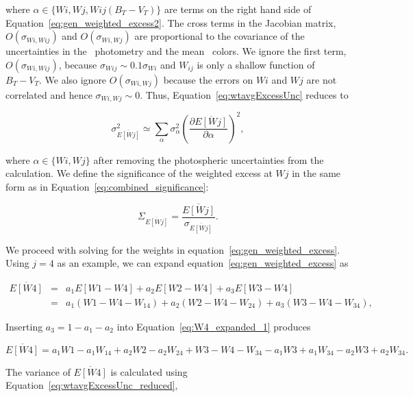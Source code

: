 \noindent where $\alpha \in \{Wi, Wj, Wij(B_T-V_T)\}$  are terms on the right hand side of Equation~\ref{eq:gen_weighted_excess2}. The cross terms in the Jacobian matrix, $O(\sigma_{Wi,Wij})$ and $O(\sigma_{Wi,Wj})$ are proportional to the covariance of the uncertainties in the \WS\ photometry and the mean \WS\ colors. We ignore the first term, $O(\sigma_{Wi,Wij})$, because $\sigma_{Wij} \sim 0.1 \sigma_{Wi}$ and $W_{ij}$ is only a shallow function of $B_T-V_T$. We also ignore $O(\sigma_{Wi,Wj})$ because the errors on $Wi$ and $Wj$ are not correlated and hence $\sigma_{Wi,Wj}\sim 0$. Thus, Equation~\ref{eq:wtavgExcessUnc} reduces to

\begin{equation}\label{eq:wtavgExcessUnc_reduced}
      \sigma_{\overline{E[Wj]}}^2 \simeq \sum_{\alpha} \sigma_{\alpha}^2 \left(\frac{\partial \overline{E[Wj]}}{\partial \alpha}\right)^2,
\end{equation}

\noindent where $\alpha \in \{Wi, Wj\}$ after removing the photospheric uncertainties from the calculation. We define the significance of the weighted excess at $Wj$ in the same form as in Equation~\ref{eq:combined_significance}:

\begin{equation}\label{eq:combined_sig_appendix}
	    \Sigma_{\overline{E[Wj]}} = \frac{\overline{E[Wj]}}{\sigma_{\overline{E[Wj]}}}. 
\end{equation}

	We proceed with solving for the weights in equation~\ref{eq:gen_weighted_excess}. Using $j=4$ as an example, we can expand equation~\ref{eq:gen_weighted_excess} as 
	
\begin{eqnarray}\label{eq:W4_expanded_1}
\overline{E[W4]} & = & a_1 E[W1-W4] + a_2 E[W2-W4] + a_3 E[W3-W4] \\
				 & = & a_1 (W1-W4-W_{14}) + a_2(W2-W4-W_{24}) + a_3(W3-W4-W_{34}),
\end{eqnarray}

\noindent Inserting $a_3 = 1-a_1-a_2$ into Equation~\ref{eq:W4_expanded_1} produces

\begin{equation}\label{eq:w4_expanded_2}
\overline{E[W4]} =  a_1W1 - a_1W_{14} + a_2 W2 - a_2 W_{24} + W3 - W4 - W_{34} - a_1W3 + a_1 W_{34} - a_2 W3 + a_2 W_{34}. 
\end{equation}

\noindent The variance of $\overline{E[W4]}$ is calculated using Equation~\ref{eq:wtavgExcessUnc_reduced},

